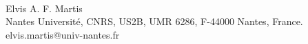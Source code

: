 











%

{\Large
\textbf{}
}
\newline
\\
Elvis A. F. Martis
\\
\bigskip
Nantes Université, CNRS, US2B, UMR 6286, F-44000 Nantes, France.
\bigskip
elvis.martis@univ-nantes.fr

